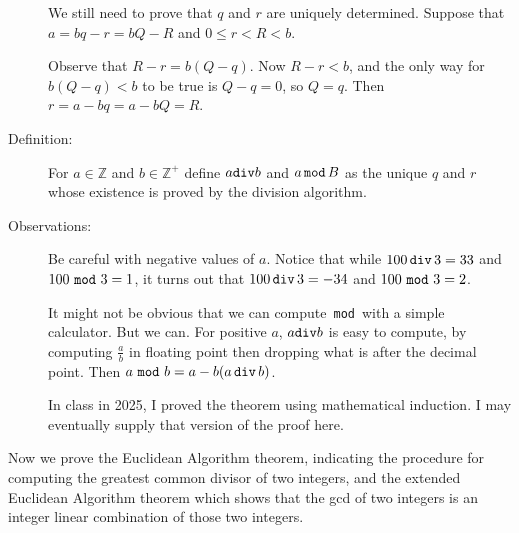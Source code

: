 \documentclass[12pt]{article}
\begin{document}
\begin{description}

We still need to prove that $q$ and $r$ are uniquely determined.  Suppose that $a=bq-r = bQ-R$ and $0\leq r < R <b$.

Observe that $R-r = b(Q-q)$.  Now $R-r<b$, and the only way for $b(Q-q)<b$ to be true is $Q-q=0$, so $Q=q$.  Then $r=a-bq = a-bQ = R$.

\item[Definition:]  For $a \in {\mathbb Z}$ and $b \in {\mathbb Z}^+$ define $a {\tt div} b$ and $a \,{\tt mod}\, B$ as the unique $q$ and $r$ whose existence is proved by the division algorithm.

\item[Observations:]  Be careful with negative values of $a$.  Notice that while $100 \,{\tt div}\, 3 = 33$ and $100\, \,{\tt mod}\,\, 3 = 1$, it turns out that 
$100\, {\tt div}\, 3 = -34$ and $100 \,\,{\tt mod}\, \,3 = 2$.

It might not be obvious that we can compute \,{\tt mod}\, with a simple calculator.  But we can.  For positive $a$, $a {\tt div} b$ is easy to compute, by computing $\frac ab$ in floating point then dropping what is after the decimal point.  Then $a\, \,{\tt mod}\,\, b=a - b(a\,{\tt div}\,b)$.

In class in 2025, I proved the theorem using mathematical induction.  I may eventually supply that version of the proof here.


\end{description}

Now we prove the Euclidean Algorithm theorem, indicating the procedure for computing the greatest common divisor of two integers, and the extended Euclidean Algorithm theorem which shows that the gcd of two integers is an integer linear combination of those two integers.
\end{document}
